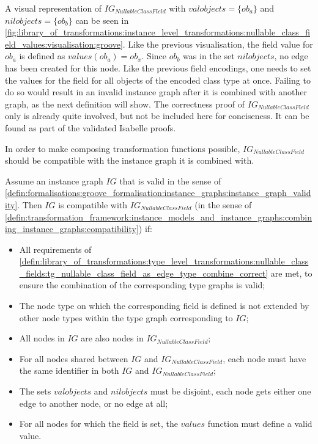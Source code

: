 A visual representation of $IG_{NullableClassField}$ with $valobjects = \{ob_a\}$ and $nilobjects = \{ob_b\}$ can be seen in \cref{fig:library_of_transformations:instance_level_transformations:nullable_class_field_values:visualisation:groove}. Like the previous visualisation, the field value for $ob_a$ is defined as $values(ob_a) = ob_x$. Since $ob_b$ was in the set $nilobjects$, no edge has been created for this node. Like the previous field encodings, one needs to set the values for the field for all objects of the encoded class type at once. Failing to do so would result in an invalid instance graph after it is combined with another graph, as the next definition will show. The correctness proof of $IG_{NullableClassField}$ only is already quite involved, but not be included here for conciseness. It can be found as part of the validated Isabelle proofs.

In order to make composing transformation functions possible, $IG_{NullableClassField}$ should be compatible with the instance graph it is combined with.

\begin{thm}
\label{defin:library_of_transformations:instance_level_transformations:nullable_class_field_values:ig_nullable_class_field_as_edge_type_combine_correct}
Assume an instance graph $IG$ that is valid in the sense of \cref{defin:formalisations:groove_formalisation:instance_graphs:instance_graph_validity}. Then $IG$ is compatible with $IG_{NullableClassField}$ (in the sense of \cref{defin:transformation_framework:instance_models_and_instance_graphs:combining_instance_graphs:compatibility}) if:
\begin{itemize}
    \item All requirements of \cref{defin:library_of_transformations:type_level_transformations:nullable_class_fields:tg_nullable_class_field_as_edge_type_combine_correct} are met, to ensure the combination of the corresponding type graphs is valid;
    \item The node type on which the corresponding field is defined is not extended by other node types within the type graph corresponding to $IG$;
    \item All nodes in $IG$ are also nodes in $IG_{NullableClassField}$;
    \item For all nodes shared between $IG$ and $IG_{NullableClassField}$, each node must have the same identifier in both $IG$ and $IG_{NullableClassField}$;
    \item The sets $valobjects$ and $nilobjects$ must be disjoint, each node gets either one edge to another node, or no edge at all;
    \item For all nodes for which the field is set, the $values$ function must define a valid value.
\end{itemize}
\end{thm}

